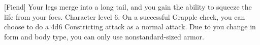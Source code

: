  {[Fiend]}
\shortdescfeat
{Your legs merge into a long tail, and you gain the ability to squeeze the life from your foes.}
{Character level 6.}
{On a successful Grapple check, you can choose to do a 4d6 Constricting attack as a normal attack. Due to you change in form and body type, you can only use nonstandard-sized armor.}